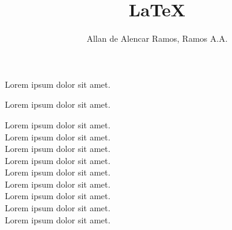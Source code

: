 \documentclass[12pt, a4paper]{article}
\begin{document}
\title{LaTeX}
\author{Allan de Alencar Ramos, Ramos A.A.}
\maketitle

\tiny{Lorem ipsum dolor sit amet.}\\

\begin{tiny}
Lorem ipsum dolor sit amet.\\
\end{tiny}

\scriptsize{Lorem ipsum dolor sit amet.}\\
\footnotesize{Lorem ipsum dolor sit amet.}\\
\small{Lorem ipsum dolor sit amet.}\\
\normalsize{Lorem ipsum dolor sit amet.}\\
\large{Lorem ipsum dolor sit amet.}\\
\Large{Lorem ipsum dolor sit amet.}\\
\LARGE{Lorem ipsum dolor sit amet.}\\
\huge{Lorem ipsum dolor sit amet.}\\
\Huge{Lorem ipsum dolor sit amet.}\\
\end{document}
